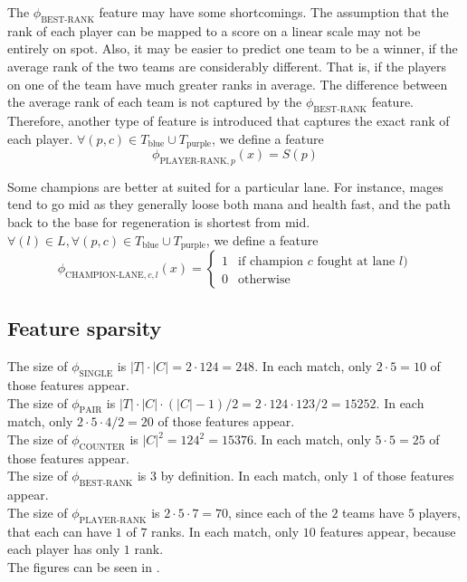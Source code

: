 The $\phi_\text{BEST-RANK}$ feature may have some shortcomings. The assumption that the rank of each player can be mapped to a score on a linear scale may not be entirely on spot.
Also, it may be easier to predict one team to be a winner, if the average rank of the two teams are considerably different. That is, if the players on one of the team have much greater ranks in average. The difference between the average rank of each team is not captured by the $\phi_\text{BEST-RANK}$ feature.
Therefore, another type of feature is introduced that captures the exact rank of each player.
$\forall(p, c) \in T_\text{blue} \cup T_\text{purple}$, we define a feature
\[
\phi_{\text{PLAYER-RANK},p}(x) = S(p)
\]

Some champions are better at suited for a particular lane. For instance, mages tend to go mid as they generally loose both mana and health fast, and the path back to the base for regeneration is shortest from mid.
$\forall(l) \in L, \forall(p, c) \in T_\text{blue} \cup T_\text{purple}$, we define a feature
\[
\phi_{\text{CHAMPION-LANE},c,l}(x) =
\begin{cases} 
  1 & \text{if champion } c \text{ fought at lane } l)\\
  0 & \text{otherwise} 
\end{cases}
\]

\subsection{Feature sparsity}\label{sec:featuresparsity}
The size of $\phi_{\text{SINGLE}}$ is $|T| \cdot |C| = 2 \cdot 124 = 248$. In each match, only $2 \cdot 5 = 10$ of those features appear.\\
The size of $\phi_{\text{PAIR}}$ is $|T| \cdot |C| \cdot (|C|-1) / 2 = 2 \cdot 124 \cdot 123 / 2 = 15252$. In each match, only $2 \cdot 5 \cdot 4 / 2 = 20$ of those features appear.\\
The size of $\phi_{\text{COUNTER}}$ is $|C|^2 = 124^2 = 15376$. In each match, only $5 \cdot 5 = 25$ of those features appear.\\
The size of $\phi_{\text{BEST-RANK}}$ is 3 by definition. In each match, only $1$ of those features appear.\\
The size of $\phi_{\text{PLAYER-RANK}}$ is $2 \cdot 5 \cdot 7 = 70$, since each of the $2$ teams have $5$ players, that each can have $1$ of $7$ ranks. In each match, only $10$ features appear, because each player has only $1$ rank.\\
The figures can be seen in .

